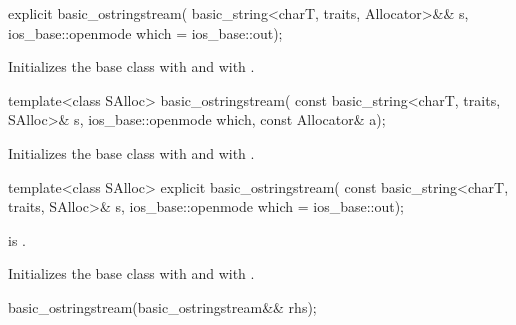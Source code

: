 %
\begin{itemdecl}
explicit basic_ostringstream(
  basic_string<charT, traits, Allocator>&& s,
  ios_base::openmode which = ios_base::out);
\end{itemdecl}

\begin{itemdescr}
\pnum
\effects
Initializes the base class with
and  with
.
\end{itemdescr}

%
\begin{itemdecl}
template<class SAlloc>
  basic_ostringstream(
    const basic_string<charT, traits, SAlloc>& s,
    ios_base::openmode which, const Allocator& a);
\end{itemdecl}

\begin{itemdescr}
\pnum
\effects
Initializes the base class with
and  with
\linebreak{}. %
\end{itemdescr}

%
\begin{itemdecl}
template<class SAlloc>
  explicit basic_ostringstream(
    const basic_string<charT, traits, SAlloc>& s,
    ios_base::openmode which = ios_base::out);
\end{itemdecl}

\begin{itemdescr}
\pnum
\constraints
{} is .

\pnum
\effects
Initializes the base class with
and  with
\linebreak{}. %
\end{itemdescr}

%
\begin{itemdecl}
basic_ostringstream(basic_ostringstream&& rhs);
\end{itemdecl}


